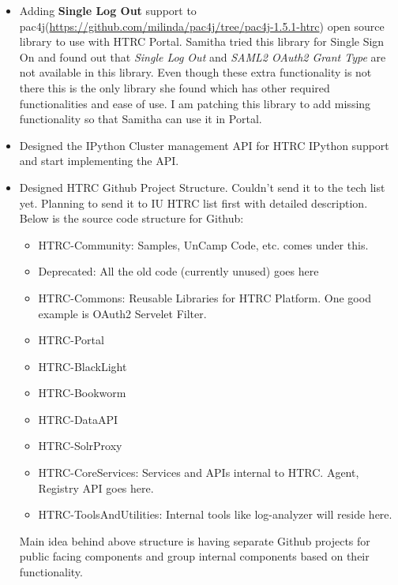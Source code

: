 \documentclass{article}
\begin{document}
\begin{itemize}
  \item Adding \textbf{Single Log Out} support to
    pac4j(\url{https://github.com/milinda/pac4j/tree/pac4j-1.5.1-htrc})
    open source library to use with HTRC Portal. Samitha tried this
    library for Single Sign On and found out that \textit{Single Log Out} and
    \textit{SAML2 OAuth2 Grant Type} are not available in this library. Even
    though these extra functionality is not there this is the only
    library she found which has other required functionalities and
    ease of use.  I am patching this library to add missing
    functionality so that Samitha can use it in Portal.
  \item Designed the IPython Cluster management API for HTRC IPython
    support and start implementing the API.
  \item Designed HTRC Github Project Structure. Couldn't send it to the
    tech list yet. Planning to send it to IU HTRC list first with
    detailed description. Below is the source code structure for
    Github:
    \begin{itemize}
    \item HTRC-Community: Samples, UnCamp Code, etc. comes under this.
    \item Deprecated: All the old code (currently unused) goes here
    \item HTRC-Commons: Reusable Libraries for HTRC Platform. One good example is OAuth2 Servelet Filter.
    \item HTRC-Portal
    \item HTRC-BlackLight
    \item HTRC-Bookworm
    \item HTRC-DataAPI
    \item HTRC-SolrProxy
    \item HTRC-CoreServices: Services and APIs internal to HTRC. Agent, Registry API goes here.
    \item HTRC-ToolsAndUtilities: Internal tools like log-analyzer will reside here.
    \end{itemize}
    Main idea behind above structure is having separate Github
    projects for public facing components and group internal
    components based on their functionality.
\end{itemize}



\end{document}

